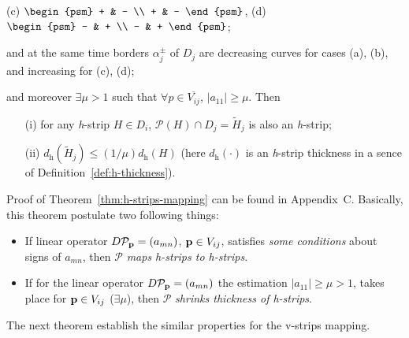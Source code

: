 \begin{theorem}
\begin{enumerate}
\begin{center}
				(c) $\begin{psm} + & - \\ + & - \end{psm}$, \quad
				(d) $\begin{psm} - & + \\ - & + \end{psm}$;		
			\end{center}
			and at the same time borders $\alpha_j^{\pm}$ of $D_j$ are decreasing curves for cases (a), (b), and increasing for (c), (d);
	\end{enumerate}
	and moreover $\exists \mu > 1$ such that $\forall p \in \overline{V_{ij}}$, $|a_{11}| \ge \mu$.
	Then
	\begin{itemize}
		\item[(i)] for any \emph{h}-strip $H \in D_i$, $\mathcal{P} (H) \cap D_j = \widetilde{H}_j$ is also an \emph{h}-strip;
		\item[(ii)] $d_{\mathrm{h}}(\widetilde{H}_j) \le (1 / \mu) d_{\mathrm{h}}(H)$ (here $d_{\mathrm{h}}(\cdot)$ is an \emph{h}-strip thickness in a sence of Definition~\ref{def:h-thickness}).
	\end{itemize}
\end{theorem}
Proof of Theorem~\ref{thm:h-strips-mapping} can be found in Appendix~C. %
Basically, this theorem postulate two following things:
\begin{itemize}
	\item If linear operator $D \mathcal{P}_{\vb{p}} = (a_{mn})$, $\vb{p} \in V_{ij}$, satisfies {\it some conditions} about signs of $a_{mn}$, then $\mathcal{P}$ {\it maps h-strips to h-strips}.
	\item If for the linear operator $D \mathcal{P}_{\vb{p}} = (a_{mn})$ the estimation $|a_{11}| \ge \mu > 1$, takes place for $\vb{p} \in V_{ij}$ ($\exists \mu$), then $\mathcal{P}$ {\it shrinks thickness of h-strips}.
\end{itemize}
The next theorem establish the similar properties for the v-strips mapping.


